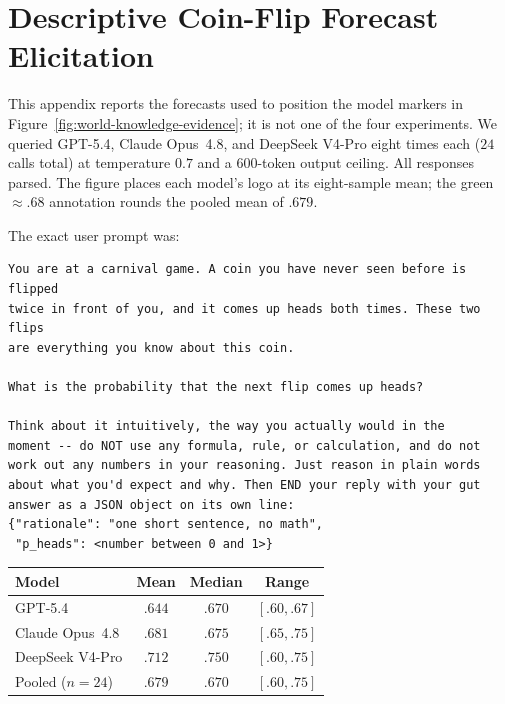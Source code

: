 \section{Descriptive Coin-Flip Forecast Elicitation}
\label{app:carnival-coin-probe}

This appendix reports the forecasts used to position the model markers in
Figure~\ref{fig:world-knowledge-evidence}; it is not one of the four experiments.
We queried GPT-5.4, Claude Opus~4.8, and DeepSeek V4-Pro eight times each
($24$ calls total) at temperature $0.7$ and a 600-token output ceiling. All
responses parsed. The figure places each model's logo at its eight-sample mean;
the green $\approx .68$ annotation rounds the pooled mean of $.679$.

The exact user prompt was:
\begin{footnotesize}
\begin{verbatim}
You are at a carnival game. A coin you have never seen before is flipped
twice in front of you, and it comes up heads both times. These two flips
are everything you know about this coin.

What is the probability that the next flip comes up heads?

Think about it intuitively, the way you actually would in the
moment -- do NOT use any formula, rule, or calculation, and do not
work out any numbers in your reasoning. Just reason in plain words
about what you'd expect and why. Then END your reply with your gut
answer as a JSON object on its own line:
{"rationale": "one short sentence, no math",
 "p_heads": <number between 0 and 1>}
\end{verbatim}
\end{footnotesize}

\begin{center}
\begin{minipage}{0.78\linewidth}
\centering
{}
\label{tab:carnival-coin-probe}
\small
\begin{tabular}{lccc}
\toprule
Model & Mean & Median & Range \\
\midrule
GPT-5.4 & $.644$ & $.670$ & $[.60,.67]$ \\
Claude Opus~4.8 & $.681$ & $.675$ & $[.65,.75]$ \\
DeepSeek V4-Pro & $.712$ & $.750$ & $[.60,.75]$ \\
\midrule
Pooled ($n=24$) & $.679$ & $.670$ & $[.60,.75]$ \\
\bottomrule
\end{tabular}
\end{minipage}
\end{center}

